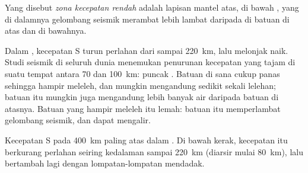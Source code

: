 \begin{definition}\label{def:g11:lithosphere-asthenosphere:lvz}
Yang disebut \emph{zona kecepatan rendah} adalah
lapisan mantel atas, di bawah , yang di dalamnya gelombang seismik
merambat lebih lambat daripada di batuan di atas dan di bawahnya.
\end{definition}

Dalam , kecepatan S turun perlahan dari  sampai
\qty{220}{km}, lalu melonjak naik. Studi seismik di seluruh dunia menemukan
penurunan kecepatan yang tajam di suatu tempat antara 70 dan \qty{100}{km}:
puncak . Batuan di sana cukup panas sehingga hampir meleleh, dan
mungkin mengandung sedikit sekali lelehan; batuan itu mungkin juga mengandung
lebih banyak air daripada batuan di atasnya. Batuan yang hampir meleleh itu
lemah: batuan itu memperlambat gelombang seismik, dan dapat mengalir.

\begin{omfigure}

{\small Kecepatan S pada \qty{400}{km} paling atas dalam . Di
bawah kerak, kecepatan itu berkurang perlahan seiring kedalaman sampai
\qty{220}{km} (diarsir mulai \qty{80}{km}), lalu bertambah lagi dengan
lompatan-lompatan mendadak.}
\end{omfigure}

